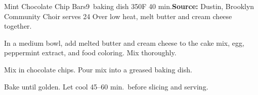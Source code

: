 \begin{recipe}{Mint Chocolate Chip Bars}{9\inch{}\inch\ baking dish \hfill 350\0F \hfill 40 min.}{\textbf{Source:} Dustin, Brooklyn Community Choir \hfill serves 24}
 Over low heat, melt butter and cream cheese together.

 In a medium bowl, add melted butter and cream cheese to the cake mix, egg, peppermint extract, and food coloring. Mix thoroughly.

 Mix in chocolate chips. Pour mix into a greased baking dish.

 \newstep Bake until golden. Let cool 45--60 min.\ before slicing and serving.
\end{recipe}

